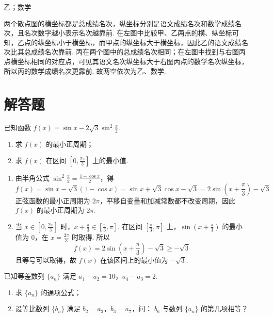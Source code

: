 \begin{answer}
乙；数学
\end{answer}

\begin{solution}
两个散点图的横坐标都是总成绩名次，纵坐标分别是语文成绩名次和数学成绩名次，且名次数字越小表示名次越靠前. 在左图中比较甲、乙两点的横、纵坐标可知，乙点的纵坐标小于横坐标，而甲点的纵坐标大于横坐标，因此乙的语文成绩名次比其总成绩名次靠前. 丙在两个图中的总成绩名次相同；在左图中找到与右图丙点横坐标相同的对应点，可见其语文名次纵坐标大于右图丙点的数学名次纵坐标，所以丙的数学成绩名次更靠前. 故两空依次为乙、数学.
\end{solution}

\section{解答题}

\begin{problem}
已知函数 \( f(x) = \sin x - 2\sqrt{3}\sin^2\frac{x}{2} \).

\begin{enumerate}
\item 求 \( f(x) \) 的最小正周期；
\item 求 \( f(x) \) 在区间 \(\left[0, \frac{2\pi}{3}\right]\) 上的最小值.
\end{enumerate}
\end{problem}

\begin{solution}
\begin{enumerate}
\item 由半角公式 \(\sin^2\frac{x}{2}=\frac{1-\cos x}{2}\)，得
\[
f(x)=\sin x-\sqrt{3}(1-\cos x)=\sin x+\sqrt{3}\cos x-\sqrt{3}=2\sin\left(x+\frac{\pi}{3}\right)-\sqrt{3}
\]
正弦函数的最小正周期为 \(2\pi\)，平移自变量和加减常数都不改变周期，因此 \(f(x)\) 的最小正周期为 \(2\pi\).
\item 当 \(x\in\left[0,\frac{2\pi}{3}\right]\) 时，\(x+\frac{\pi}{3}\in\left[\frac{\pi}{3},\pi\right]\). 在区间 \(\left[\frac{\pi}{3},\pi\right]\) 上，\(\sin\left(x+\frac{\pi}{3}\right)\) 的最小值为 \(0\)，在 \(x=\frac{2\pi}{3}\) 时取得. 所以
\[
f(x)=2\sin\left(x+\frac{\pi}{3}\right)-\sqrt{3}\geq-\sqrt{3}
\]
且等号可以取得，故 \(f(x)\) 在该区间上的最小值为 \(-\sqrt{3}\).
\end{enumerate}
\end{solution}

\begin{problem}
已知等差数列 \(\{a_{n}\}\) 满足 \(a_1 + a_2 = 10\)，\(a_4 - a_3 = 2\).

\begin{enumerate}
\item 求 \(\{a_{n}\}\) 的通项公式；
\item 设等比数列 \(\{b_{n}\}\) 满足 \(b_{2}=a_{3}\)，\(b_{3}=a_{7}\)，问： \(b_{6}\) 与数列 \(\{a_{n}\}\) 的第几项相等？
\end{enumerate}
\end{problem}

